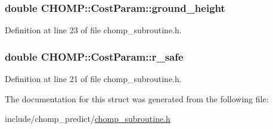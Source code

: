 \subsubsection[{\texorpdfstring{ground\+\_\+height}{ground_height}}]{\setlength{\rightskip}{0pt plus 5cm}double C\+H\+O\+M\+P\+::\+Cost\+Param\+::ground\+\_\+height}\hypertarget{struct_c_h_o_m_p_1_1_cost_param_afdb481a80ee8ef47dc837075993f0821}{}\label{struct_c_h_o_m_p_1_1_cost_param_afdb481a80ee8ef47dc837075993f0821}


Definition at line 23 of file chomp\+\_\+subroutine.\+h.

\subsubsection[{\texorpdfstring{r\+\_\+safe}{r_safe}}]{\setlength{\rightskip}{0pt plus 5cm}double C\+H\+O\+M\+P\+::\+Cost\+Param\+::r\+\_\+safe}\hypertarget{struct_c_h_o_m_p_1_1_cost_param_a9ab5a375539e209151d57dea31b4eed9}{}\label{struct_c_h_o_m_p_1_1_cost_param_a9ab5a375539e209151d57dea31b4eed9}


Definition at line 21 of file chomp\+\_\+subroutine.\+h.



The documentation for this struct was generated from the following file\+:\begin{DoxyCompactItemize}
\item 
include/chomp\+\_\+predict/\hyperlink{chomp__subroutine_8h}{chomp\+\_\+subroutine.\+h}\end{DoxyCompactItemize}
